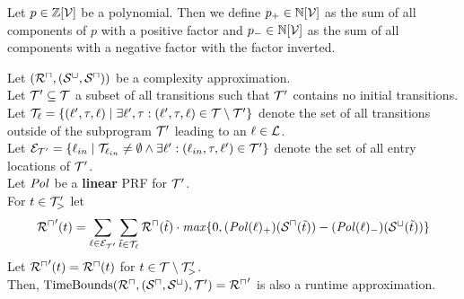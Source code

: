 \begin{definition}
  Let $p \in \mathbb{Z}[\mathcal{V}]$ be a polynomial.
  Then we define $p_+ \in \mathbb{N}[\mathcal{V}]$ as the sum of all components of $p$ with a positive factor and $p_- \in \mathbb{N}[\mathcal{V}]$ as the sum of all components with a negative factor with the factor inverted.
\end{definition}

\begin{theorem}[TimeBounds]
  Let $({\mathcal{R}^\sqcap}, {({\mathcal{S}^\sqcup}, {\mathcal{S}^\sqcap})})$ be a complexity approximation. \\
  Let $\mathcal{T}' \subseteq \mathcal{T}$ a subset of all transitions such that $\mathcal{T}'$ contains no initial transitions. \\
  Let $\mathcal{T}_{\ell} = \lbrace (\ell', \tau, \ell) \mid \exists \ell', \tau: (\ell', \tau, \ell) \in \mathcal{T} \setminus \mathcal{T}' \rbrace$ denote the set of all transitions outside of the subprogram $\mathcal{T}'$ leading to an $\ell \in \mathcal{L}$. \\
  Let $\mathcal{E}_{\mathcal{T}'} = \lbrace \ell_{in} \mid \mathcal{T}_{\ell_{in}} \neq \emptyset \wedge \exists \ell': (\ell_{in}, \tau, \ell') \in \mathcal{T}' \rbrace$ denote the set of all entry locations of $\mathcal{T}'$. \\
  Let $\mathit{Pol}$ be a \textbf{linear} PRF for $\mathcal{T}'$. \\
  For $t \in \mathcal{T}'_>$ let
  \[ {\mathcal{R}^\sqcap}'(t) = \sum_{\ell \in \mathcal{E}_{\mathcal{T}'}} \sum_{\tilde{t} \in \mathcal{T}_\ell} {\mathcal{R}^\sqcap}(\tilde{t}) \cdot \mathit{max} \lbrace 0, (\mathit{Pol}(\ell)_+)({\mathcal{S}^\sqcap}(\tilde{t})) - (\mathit{Pol}(\ell)_-)({\mathcal{S}^\sqcup}(\tilde{t})) \rbrace \]
  Let ${\mathcal{R}^\sqcap}'(t) = {\mathcal{R}^\sqcap}(t)$ for $t \in \mathcal{T} \setminus \mathcal{T}'_>$. \\
  Then, $\text{TimeBounds}({\mathcal{R}^\sqcap}, ({\mathcal{S}^\sqcap}, {\mathcal{S}^\sqcup}), \mathcal{T}') = {\mathcal{R}^\sqcap}'$ is also a runtime approximation.
\end{theorem}
